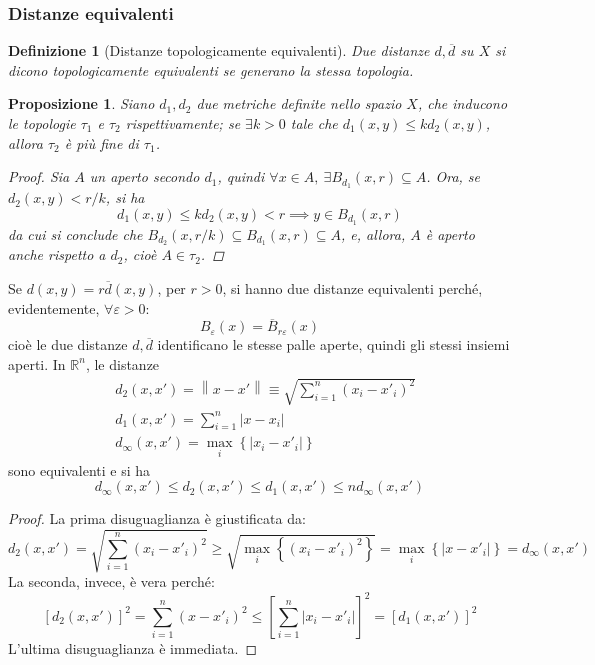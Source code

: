 \documentclass[12pt]{scrartcl}
\theoremstyle{style}
\newtheorem{definizione}{Definizione}[section]
\newtheorem{prop}{Proposizione}[section]
\numberwithin{equation}{subsection}
\begin{document}
\subsubsection{Distanze equivalenti}
\begin{definizione}
	[Distanze topologicamente equivalenti]
	Due distanze $d,\overline{d}$ su $X$ si dicono \textit{topologicamente equivalenti} se generano la stessa topologia.
\end{definizione}
\begin{prop}
	Siano $d_1,d_2$ due metriche definite nello spazio $X$, che inducono le topologie $\tau _1$ e $\tau _2$ rispettivamente; se $\exists k>0$ tale che $d_1(x,y) \le kd_2(x,y)$, allora $\tau _2$ \`e pi\`u fine di $\tau _1$.
	\begin{proof}
		Sia $A$ un aperto secondo $d_1$, quindi $\forall x \in A, \ \exists B_{d_1} (x,r) \subseteq A$.
		Ora, se $d_2(x,y) < r / k$, si ha 
		\[
		d_1(x,y) \le k d_2(x,y) < r \implies y \in B_{d_1} (x,r)
		\] 
		da cui si conclude che $B_{d_2} (x,r / k) \subseteq B_{d_1} (x,r) \subseteq A$, e, allora, $A$ \`e aperto anche rispetto a $d_2$, cio\`e $A \in \tau _2$.
		
	\end{proof}
\end{prop}
\noindent Se $d(x,y) = r\overline{d}(x,y)$, per $r>0$, si hanno due distanze equivalenti perch\'e, evidentemente, $\forall \varepsilon >0$:
\[
B_\varepsilon (x) = \overline{B}_{r\varepsilon } (x)
\] 
cio\`e le due distanze $d,\overline{d}$ identificano le stesse palle aperte, quindi gli stessi insiemi aperti.
In $\mathbb{R}^n$, le distanze 
\begin{equation}
	\begin{split}
		&d_2(x,x') = \left\lVert x-x' \right\rVert \equiv \sqrt{\sum_{i=1}^{n} (x_i-x'_i)^2} \\
		&d_1(x,x') = \sum_{i=1}^{n} \lvert x-x_i \rvert \\
		&d_{\infty}(x,x') = \max_{i} \left\{ \lvert x_i-x'_i \rvert  \right\} 
	\end{split}
\end{equation}
sono equivalenti e si ha
\begin{equation}
	d_{\infty} (x,x') \le d_2(x,x') \le d_1 (x,x') \le n d_\infty(x,x')
\end{equation}
\begin{proof}
	La prima disuguaglianza \`e giustificata da:
	\[
	d_2 (x,x') = \sqrt{\sum_{i=1}^{n} (x_i -x'_i)^2}  \ge \sqrt{\max_i  \left\{ (x_i-x'_i)^2 \right\} } = \max_i \left\{ \lvert x-x'_i \rvert  \right\} = d_\infty(x,x')
	\] 
	La seconda, invece, \`e vera perch\'e:
	\[
	\left[ d_2(x,x') \right] ^2 = \sum_{i=1}^{n} (x-x'_i)^2 \le \left[ \sum_{i=1}^{n} \lvert x_i-x'_i \rvert  \right] ^2 = \left[ d_1(x,x') \right]^2 
	\] 
L'ultima disuguaglianza \`e immediata.	
\end{proof}
\end{document}
